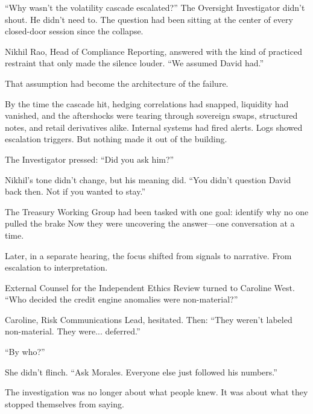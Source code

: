 “Why wasn’t the volatility cascade escalated?”
The Oversight Investigator didn’t shout. He didn’t need to. The question had been sitting at the center of every 
closed-door session since the collapse.

Nikhil Rao, Head of Compliance Reporting, answered with the kind of practiced restraint that only made the silence louder.
“We assumed David had.”

That assumption had become the architecture of the failure.

By the time the cascade hit, hedging correlations had snapped, liquidity had vanished, and the aftershocks were tearing 
through sovereign swaps, structured notes, and retail derivatives alike.
Internal systems had fired alerts.
Logs showed escalation triggers.
But nothing made it out of the building.

The Investigator pressed:
“Did you ask him?”

Nikhil’s tone didn’t change, but his meaning did.
“You didn’t question David back then. Not if you wanted to stay.”

The Treasury Working Group had been tasked with one goal:
identify why no one pulled the brake
Now they were uncovering the answer—one conversation at a time.

Later, in a separate hearing, the focus shifted from signals to narrative.
From escalation to interpretation.

External Counsel for the Independent Ethics Review turned to Caroline West.
“Who decided the credit engine anomalies were non-material?”

Caroline, Risk Communications Lead, hesitated. Then:
“They weren’t labeled non-material. They were... deferred.”

“By who?”

She didn’t flinch.
“Ask Morales. Everyone else just followed his numbers.”

The investigation was no longer about what people knew.
It was about what they stopped themselves from saying.

\medskip

